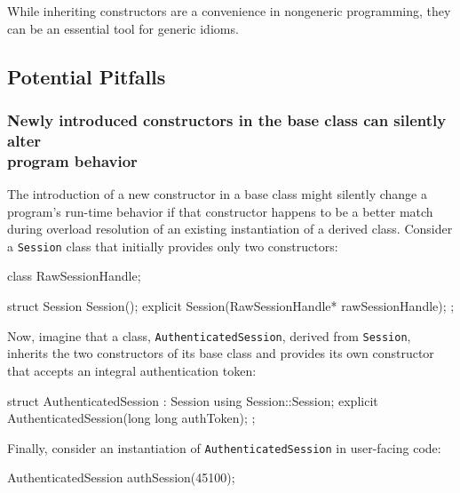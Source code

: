 \noindent While inheriting constructors are a convenience in nongeneric
programming, they can be an essential tool for generic idioms.

\subsection[Potential Pitfalls]{Potential Pitfalls}\label{potential-pitfalls-ctorinheriting}

\subsubsection[Newly introduced constructors in the base class can silently alter program behavior]{Newly introduced constructors in the base class can silently alter\\[0.5ex] program behavior}\label{newly-introduced-constructors-in-the-base-class-can-silently-alter-program-behavior}

The introduction of a new constructor in a base class might silently
change a program's run-time behavior if that constructor happens to be a
better match during overload resolution of an existing instantiation of
a derived class. Consider a \lstinline!Session! class that initially provides only two constructors:

\begin{emcppshiddenlisting}
class RawSessionHandle;
\end{emcppshiddenlisting}
\begin{emcppslisting}[language=C++]
struct Session
{
    Session();
    explicit Session(RawSessionHandle* rawSessionHandle);
};
\end{emcppslisting}
    
\noindent Now, imagine that a class, \lstinline!AuthenticatedSession!, derived from
\lstinline!Session!, inherits the two constructors of its base class and provides its own constructor that accepts an integral
authentication token:

\begin{emcppslisting}[language=C++]
struct AuthenticatedSession : Session
{
    using Session::Session;
    explicit AuthenticatedSession(long long authToken);
};
\end{emcppslisting}
    
\noindent Finally, consider an instantiation of \lstinline!AuthenticatedSession! in
user-facing code:

\begin{emcppslisting}[language=C++]
AuthenticatedSession authSession(45100);
\end{emcppslisting}
    
